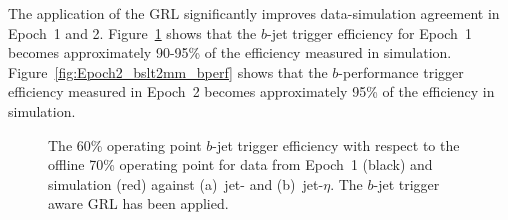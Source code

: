 The application of the GRL significantly improves data-simulation agreement in Epoch~1 and 2.
Figure~\ref{fig:Epoch1_bslt2mm_eff} shows that the $b$-jet trigger efficiency for Epoch~1 becomes approximately 90-95\% of the efficiency measured in simulation.
Figure~\ref{fig:Epoch2_bslt2mm_bperf} shows that the \mbox{$b$-performance} trigger efficiency measured in Epoch~2 becomes approximately 95\% of the efficiency in simulation.

\begin{figure}[!htb]
  \begin{center}
    \captionsetup[subfigure]{aboveskip=0pt,justification=centering}
  \end{center}
\vspace{-1em}
  \caption[
  The $b$-jet trigger efficiency for data from Epoch~2 and for simulated events.
  The $b$-jet trigger aware GRL has been applied.
]
        {The 60\% operating point $b$-jet trigger efficiency with respect to the offline 70\% operating point
    for data from Epoch~1 (black) and simulation (red) against (a)~jet-\pT{} and (b)~jet-$\eta$.
    The $b$-jet trigger aware GRL has been applied.}
  \label{fig:Epoch1_bslt2mm_eff}
\end{figure}

